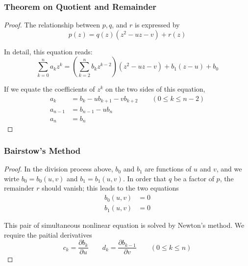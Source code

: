 \documentclass[notheorems,mathserif,table,compress]{beamer}  %
\begin{document}
\begin{frame}
\frametitle{Theorem on Quotient and Remainder}
\begin{proof}
The relationship between $p,q$, and $r$ is expressed by 
\begin{displaymath}
p(z)=q(z)(z^2-uz-v)+r(z)
\end{displaymath}

In detail, this equation reads:
\begin{displaymath}
\sum_{k=0}^n a_kz^k=(\sum_{k=2}^n b_kz^{k-2})(z^2-uz-v)+b_1(z-u)+b_0
\end{displaymath}

If we equate the coefficients of $z^k$ on the two sides of this equation,
\begin{equation*}
\begin{split}
a_k & =b_k- ub_{k+1}-vb_{k+2}  \qquad (0\leq k\leq n-2)\\
a_{n-1} & =b_{n-1}-ub_n\\
a_n &=b_n
\end{split}
\end{equation*}

\end{proof}
\end{frame}

\begin{frame}
\frametitle{Bairstow's Method}
\begin{proof}
In the division process above, $b_0$ and $b_1$ are functions of $u$ and $v$, and we wirte $b_0=b_0(u,v)$ and $b_1=b_1(u,v)$. In order that $q$ be a factor of $p$, the remainder $r$ should vanish; this leads to the two equations
\begin{equation*}
\begin{split}
b_0(u,v)&=0\\
b_1(u,v)&=0
\end{split}
\end{equation*}

This pair of simultaneous nonlinear equation is solved by Newton's method. We require the paitial derivatives
\begin{displaymath}
c_k=\frac{\partial b_k}{\partial u}\qquad d_k=\frac{\partial b_{k-1}}{\partial v}\qquad (0\leq k\leq n)
\end{displaymath}

\end{proof}
\end{frame}
\end{document}
